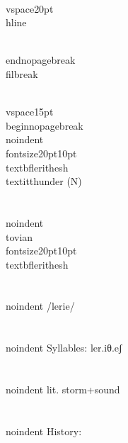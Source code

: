 \\vspace{20pt}\\hline

\\end{nopagebreak}
\\filbreak



\\vspace{15pt}
\\begin{nopagebreak}
\\noindent{\\fontsize{20pt}{10pt}\\textbf{lerithesh} } \\textit{thunder} (N)\\\\
\\noindent {\\tovian \\fontsize{20pt}{10pt} \\textbf{lerithesh} }\\\\
\\noindent /ler{\textprimstress}i{\texttheta}e{\textesh}/\\\\
\\noindent Syllables: ler.iθ.eʃ\\\\
\\noindent lit. storm+sound\\\\


\\noindent History:


